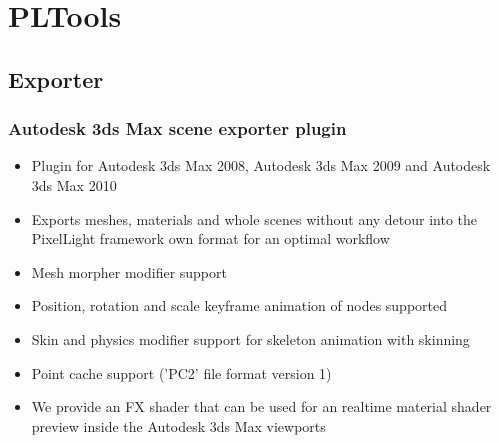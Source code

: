 \chapter{PLTools}




\section{Exporter}


\subsection{Autodesk 3ds Max scene exporter plugin}
\begin{itemize}
\item{Plugin for Autodesk 3ds Max 2008, Autodesk 3ds Max 2009 and Autodesk 3ds Max 2010}
\item{Exports meshes, materials and whole scenes without any detour into the PixelLight framework own format for an optimal workflow}
\item{Mesh morpher modifier support}
\item{Position, rotation and scale keyframe animation of nodes supported}
\item{Skin and physics modifier support for skeleton animation with skinning}
\item{Point cache support ('PC2' file format version 1)}
\item{We provide an FX shader that can be used for an realtime material shader preview inside the Autodesk 3ds Max viewports}
\end{itemize}
